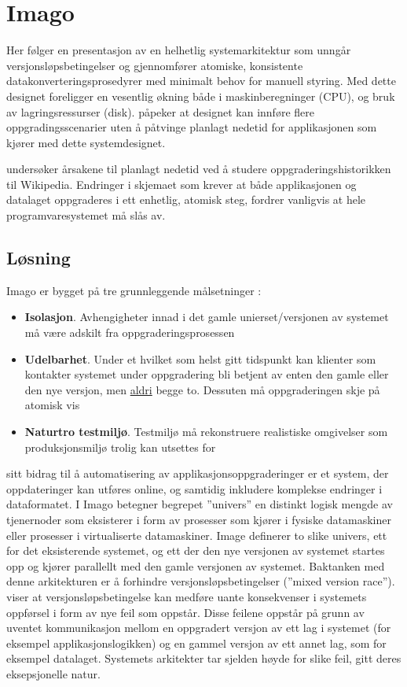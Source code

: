 \section{Imago}

Her følger en presentasjon av en helhetlig systemarkitektur som unngår versjonsløpsbetingelser og gjennomfører atomiske, konsistente datakonverteringsprosedyrer med minimalt behov for manuell styring. Med dette designet foreligger en vesentlig økning både i maskinberegninger (CPU), og bruk av lagringsressurser (disk). \cite{dumitras2009nodowntime} påpeker at designet kan innføre flere oppgradingsscenarier uten å påtvinge planlagt nedetid for applikasjonen som kjører med dette systemdesignet.

\cite{dumitras2009nodowntime} undersøker årsakene til planlagt nedetid ved å studere oppgraderingshistorikken til Wikipedia. Endringer i skjemaet som krever at både applikasjonen og datalaget oppgraderes i ett enhetlig, atomisk steg, fordrer vanligvis at hele programvaresystemet må slås av.

\subsection{Løsning} \label{imagolist}
Imago er bygget på tre grunnleggende målsetninger \citep{dumitracs2009upgrades}:
\begin{itemize}
  \item \textbf{Isolasjon}. Avhengigheter innad i det gamle unierset/versjonen av systemet må være adskilt fra oppgraderingsprosessen
  \item \textbf{Udelbarhet}. Under et hvilket som helst gitt tidspunkt kan klienter som kontakter systemet under oppgradering bli betjent av enten den gamle eller den nye versjon, men \underline{aldri} begge to. Dessuten må oppgraderingen skje på atomisk vis
  \item \textbf{Naturtro testmiljø}. Testmiljø må rekonstruere realistiske omgivelser som produksjonsmiljø trolig kan utsettes for
\end{itemize}

\cite{dumitracs2009upgrades} sitt bidrag til å automatisering av applikasjonsoppgraderinger er et system, der oppdateringer kan utføres online, og samtidig inkludere komplekse endringer i dataformatet. I Imago betegner begrepet ''univers'' en distinkt logisk mengde av tjenernoder som eksisterer i form av prosesser som kjører i fysiske datamaskiner eller prosesser i virtualiserte datamaskiner. Image definerer to slike univers, ett for det eksisterende systemet, og ett der den nye versjonen av systemet startes opp og kjører parallellt med den gamle versjonen av systemet. Baktanken med denne arkitekturen er å forhindre versjonsløpsbetingelser (''mixed version race''). \cite{dumitras2010upgrade} viser at versjonsløpsbetingelse kan medføre uante konsekvenser i systemets oppførsel i form av nye feil som oppstår. Disse feilene oppstår på grunn av uventet kommunikasjon mellom en oppgradert versjon av ett lag i systemet (for eksempel applikasjonslogikken) og en gammel versjon av ett annet lag, som for eksempel datalaget. Systemets arkitekter tar sjelden høyde for slike feil, gitt deres eksepsjonelle natur.

